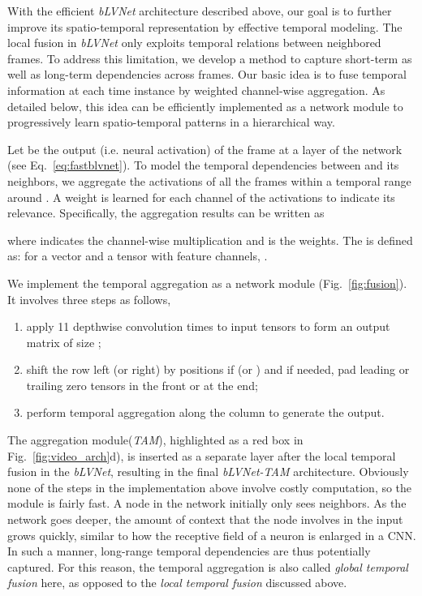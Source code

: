 \documentclass{article}
\def\blvnetnew{\textit{bLVNet}\xspace}
\def\DTA{\textit{bLVNet-TAM}\xspace}
\def\TAM{\textit{TAM}\xspace}
\begin{document}
With the efficient \blvnetnew architecture described above, our goal is to further improve its spatio-temporal representation by effective temporal modeling. The local fusion in \blvnetnew only exploits temporal relations between neighbored frames. To address this limitation, we develop a method to capture short-term as well as long-term dependencies across frames. Our basic idea is to fuse temporal information at each time instance by weighted channel-wise aggregation. As detailed below, this idea can be efficiently implemented as a network module to progressively learn spatio-temporal patterns in a hierarchical way. 

Let  be the output (i.e. neural activation) of the  frame  at a layer of the network (see Eq.~\ref{eq:fastblvnet}). To model the temporal dependencies between  and its neighbors, we aggregate the activations of all the frames within a temporal range  around . A weight is learned for each channel of the activations to indicate its relevance. Specifically, the aggregation results can be written as

where  indicates the channel-wise multiplication and  is the weights. The  is defined as: for a vector  and a tensor  with  feature channels, .

We implement the temporal aggregation as a network module (Fig.~\ref{fig:fusion}). It involves three steps as follows, 
\begin{enumerate}
\item apply 11 depthwise convolution  times to  input tensors to form an output matrix of size ; 
\item shift the  row left (or right) by  positions if  (or ) and if needed, pad leading or trailing zero tensors in the front or at the end;
\item perform temporal aggregation along the column to generate the output.
\end{enumerate}

The aggregation module(\TAM), highlighted as a red box in Fig.~\ref{fig:video_arch}d), is inserted as a separate layer after the local temporal fusion in the \blvnetnew, resulting in the final \DTA architecture.
Obviously none of the steps in the implementation above involve costly computation, so the module is fairly fast. A node in the network initially only sees  neighbors. As the network goes deeper, the amount of context that the node involves in the input grows quickly, similar to how the receptive field of a neuron is enlarged in a CNN. In such a manner, long-range temporal dependencies are thus potentially captured. For this reason, the temporal aggregation is also called \textit{global temporal fusion} here, as opposed to the \textit{local temporal fusion} discussed above. 
\end{document}

